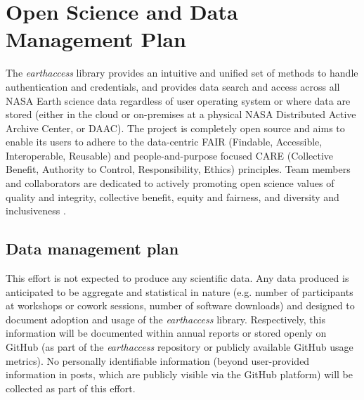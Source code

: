 \section{Open Science and Data Management Plan} \label{data_mgmt}

The \textit{earthaccess} library provides an intuitive and unified set of methods to handle authentication and credentials, and provides data search and access across all NASA Earth science data regardless of user operating system or where data are stored (either in the cloud or on-premises at a physical NASA Distributed Active Archive Center, or DAAC). The project is completely open source and aims to enable its users to adhere to the data-centric FAIR (Findable, Accessible, Interoperable, Reusable) and people-and-purpose focused CARE (Collective Benefit, Authority to Control, Responsibility, Ethics) principles. Team members and collaborators are dedicated to actively promoting open science values of quality and integrity, collective benefit, equity and fairness, and diversity and inclusiveness \citep{UNESCO2021}.


\subsection{Data management plan}

This effort is not expected to produce any scientific data. Any data produced is anticipated to be aggregate and statistical in nature (e.g. number of participants at workshops or cowork sessions, number of software downloads) and designed to document adoption and usage of the \textit{earthaccess} library. Respectively, this information will be documented within annual reports or stored openly on GitHub (as part of the \textit{earthaccess} repository or publicly available GitHub usage metrics). No personally identifiable information (beyond user-provided information in posts, which are publicly visible via the GitHub platform) will be collected as part of this effort.

